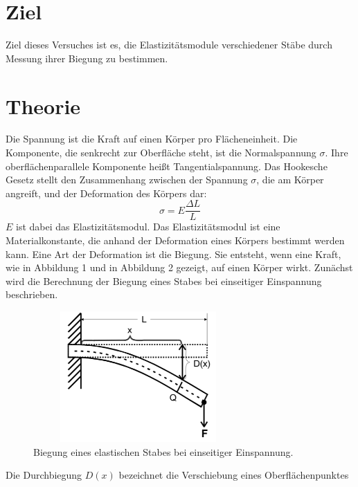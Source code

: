 

\maketitle
\tableofcontents
\newpage
\section{Ziel}
Ziel dieses Versuches ist es, die Elastizitätsmodule
verschiedener Stäbe durch Messung ihrer Biegung
zu bestimmen.
\section{Theorie}
Die Spannung ist die Kraft auf einen Körper pro Flächeneinheit.
Die Komponente, die senkrecht zur Oberfläche steht,
ist die Normalspannung $\sigma$. Ihre oberflächenparallele
Komponente heißt Tangentialspannung.
Das Hookesche Gesetz stellt den Zusammenhang zwischen
der Spannung $\sigma$, die am Körper angreift, und der
Deformation des Körpers dar:
\begin{equation}
\sigma = E \frac{\Delta L}{L}
\label{eqn:Hooke}
\end{equation}
$E$ ist dabei das Elastizitätsmodul.
Das Elastizitätsmodul ist eine Materialkonstante, die
anhand der Deformation eines Körpers bestimmt werden kann.
Eine Art der Deformation ist die Biegung. Sie entsteht, wenn
eine Kraft, wie in Abbildung 1 und in Abbildung 2 gezeigt, auf einen Körper wirkt. %
Zunächst wird die Berechnung der Biegung eines Stabes bei einseitiger
Einspannung beschrieben. %
\begin{figure}
    \centering
\includegraphics[width= 8cm, height= 5cm]{./plots/abb1.png}
\caption{Biegung eines elastischen Stabes bei einseitiger Einspannung. \cite{V103}}
\label{fig:abb1}
\end{figure}
Die Durchbiegung $D(x)$ bezeichnet die Verschiebung eines Oberflächenpunktes
